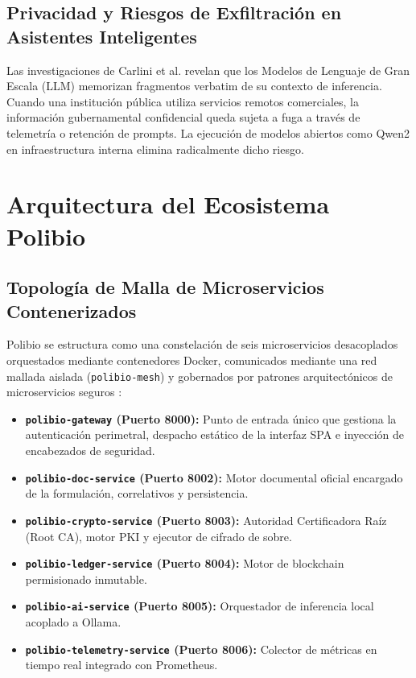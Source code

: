 \documentclass[journal,10pt]{IEEEtran}
\begin{document}
\subsection{Privacidad y Riesgos de Exfiltración en Asistentes Inteligentes}
Las investigaciones de Carlini et al. \cite{carlini2021extracting} revelan que los Modelos de Lenguaje de Gran Escala (LLM) memorizan fragmentos verbatim de su contexto de inferencia. Cuando una institución pública utiliza servicios remotos comerciales, la información gubernamental confidencial queda sujeta a fuga a través de telemetría o retención de prompts. La ejecución de modelos abiertos como Qwen2 \cite{yang2024qwen2} en infraestructura interna elimina radicalmente dicho riesgo.

\section{Arquitectura del Ecosistema Polibio}
\subsection{Topología de Malla de Microservicios Contenerizados}
Polibio se estructura como una constelación de seis microservicios desacoplados orquestados mediante contenedores Docker, comunicados mediante una red mallada aislada (\texttt{polibio-mesh}) y gobernados por patrones arquitectónicos de microservicios seguros \cite{yarygina2018overcoming}:
\begin{itemize}
    \item \textbf{\texttt{polibio-gateway} (Puerto 8000):} Punto de entrada único que gestiona la autenticación perimetral, despacho estático de la interfaz SPA e inyección de encabezados de seguridad.
    \item \textbf{\texttt{polibio-doc-service} (Puerto 8002):} Motor documental oficial encargado de la formulación, correlativos y persistencia.
    \item \textbf{\texttt{polibio-crypto-service} (Puerto 8003):} Autoridad Certificadora Raíz (Root CA), motor PKI y ejecutor de cifrado de sobre.
    \item \textbf{\texttt{polibio-ledger-service} (Puerto 8004):} Motor de blockchain permisionado inmutable.
    \item \textbf{\texttt{polibio-ai-service} (Puerto 8005):} Orquestador de inferencia local acoplado a Ollama.
    \item \textbf{\texttt{polibio-telemetry-service} (Puerto 8006):} Colector de métricas en tiempo real integrado con Prometheus.
\end{itemize}
\end{document}
